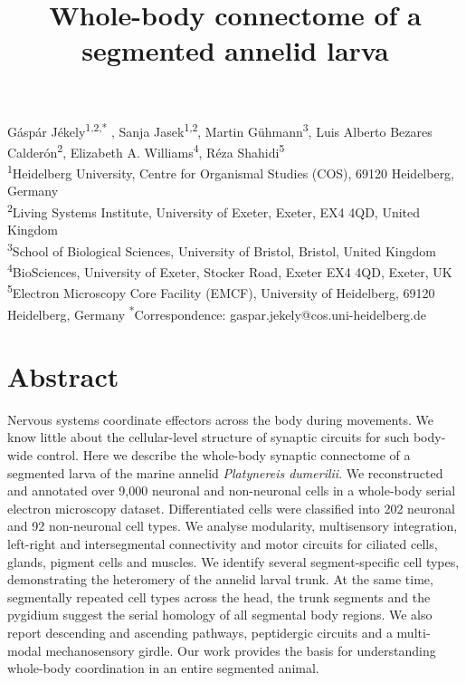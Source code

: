\documentclass[
  11pt,
]{article}
\title{Whole-body connectome of a segmented annelid larva}
\author{}
\date{}
\renewcommand*\contentsname{Table of contents}
\newcommand\contentsname{Table of contents}
\begin{document}
\maketitle

\linenumbers

\renewcommand*\contentsname{Table of contents}
{
\hypersetup{linkcolor=}
\setcounter{tocdepth}{3}
\tableofcontents
}
\hfill\break

Gáspár Jékely\textsuperscript{1,2,*} , Sanja Jasek\textsuperscript{1,2},
Martin Gühmann\textsuperscript{3}, Luis Alberto Bezares
Calderón\textsuperscript{2}, Elizabeth A. Williams\textsuperscript{4},
Réza Shahidi\textsuperscript{5}\\

\textsuperscript{1}Heidelberg University, Centre for Organismal Studies
(COS), 69120 Heidelberg, Germany\\
\textsuperscript{2}Living Systems Institute, University of Exeter,
Exeter, EX4 4QD, United Kingdom\\
\textsuperscript{3}School of Biological Sciences, University of Bristol,
Bristol, United Kingdom\\
\textsuperscript{4}BioSciences, University of Exeter, Stocker Road,
Exeter EX4 4QD, Exeter, UK \textsuperscript{5}Electron Microscopy Core
Facility (EMCF), University of Heidelberg, 69120 Heidelberg, Germany
\textsuperscript{*}Correspondence: gaspar.jekely@cos.uni-heidelberg.de

\section{Abstract}\label{abstract}

Nervous systems coordinate effectors across the body during movements.
We know little about the cellular-level structure of synaptic circuits
for such body-wide control. Here we describe the whole-body synaptic
connectome of a segmented larva of the marine annelid \emph{Platynereis
dumerilii}. We reconstructed and annotated over 9,000 neuronal and
non-neuronal cells in a whole-body serial electron microscopy dataset.
Differentiated cells were classified into 202 neuronal and 92
non-neuronal cell types. We analyse modularity, multisensory
integration, left-right and intersegmental connectivity and motor
circuits for ciliated cells, glands, pigment cells and muscles. We
identify several segment-specific cell types, demonstrating the
heteromery of the annelid larval trunk. At the same time, segmentally
repeated cell types across the head, the trunk segments and the pygidium
suggest the serial homology of all segmental body regions. We also
report descending and ascending pathways, peptidergic circuits and a
multi-modal mechanosensory girdle. Our work provides the basis for
understanding whole-body coordination in an entire segmented animal.
\end{document}
